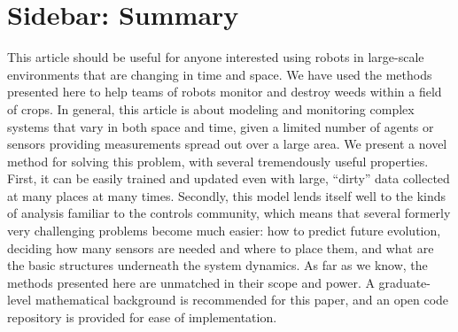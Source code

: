 \section[Nontechnical summary]{Sidebar: Summary}\label{sb:summary}

This article should be useful for anyone interested using robots in large-scale environments that are changing in time and space. We have used the methods presented here to help teams of robots  monitor and destroy weeds within a field of crops. In general, this article is about modeling and monitoring complex systems that vary in both space and time, given a limited number of agents or sensors providing measurements spread out over a large area. We present a novel method for solving this problem, with several tremendously useful properties. First, it can be easily trained and updated even with large, ``dirty'' data collected at many places at many times. Secondly, this model lends itself well to the kinds of analysis familiar to the controls community, which means that several formerly very challenging problems become much easier: how to predict future evolution, deciding how many sensors are needed and where to place them, and what are the basic structures underneath the system dynamics. As far as we know, the methods presented here are unmatched in their scope and power. A graduate-level mathematical background is recommended for this paper, and an open code repository is provided for ease of implementation.